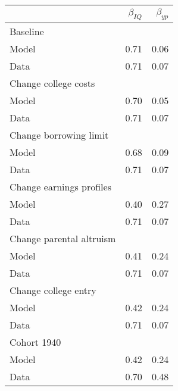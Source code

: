 \begin{tabular}{lrr}
\hline
  & $\beta_{IQ}$  & $\beta_{yp}$  \\ 
\hline
Baseline &   &   \\ 
Model & 0.71  & 0.06  \\ 
Data & 0.71  & 0.07  \\ 
Change college costs &   &   \\ 
Model & 0.70  & 0.05  \\ 
Data & 0.71  & 0.07  \\ 
Change borrowing limit &   &   \\ 
Model & 0.68  & 0.09  \\ 
Data & 0.71  & 0.07  \\ 
Change earnings profiles &   &   \\ 
Model & 0.40  & 0.27  \\ 
Data & 0.71  & 0.07  \\ 
Change parental altruism &   &   \\ 
Model & 0.41  & 0.24  \\ 
Data & 0.71  & 0.07  \\ 
Change college entry &   &   \\ 
Model & 0.42  & 0.24  \\ 
Data & 0.71  & 0.07  \\ 
Cohort 1940 &   &   \\ 
Model & 0.42  & 0.24  \\ 
Data & 0.70  & 0.48  \\ 
\hline
\end{tabular}%
